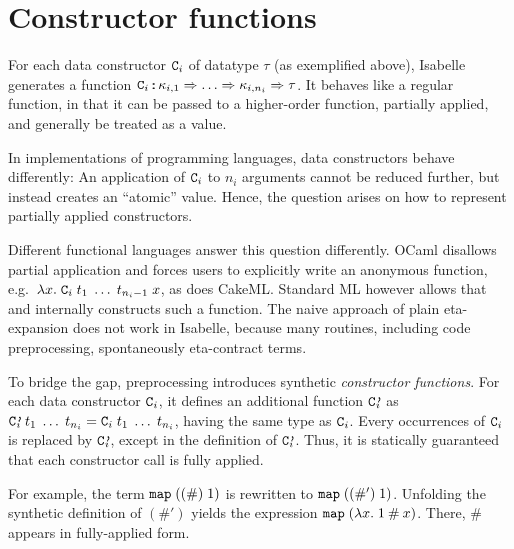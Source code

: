 
\section{Constructor functions}
\label{sec:preproc:constructor}


\noindent
For each data constructor $\texttt{\textup{C}}_i$ of datatype $\tau$ (as exemplified above), Isabelle generates a function $\texttt{\textup{C}}_i \mathbin{:\!\!:} \kappa_{i,1} \Rightarrow \ldots \Rightarrow \kappa_{i,n_i} \Rightarrow \tau$.
It behaves like a regular function, in that it can be passed to a higher-order function, partially applied, and generally be treated as a value.

In implementations of programming languages, data constructors behave differently:
An application of $\texttt{\textup{C}}_i$ to $n_i$ arguments cannot be reduced further, but instead creates an ``atomic'' value.
Hence, the question arises on how to represent partially applied constructors.

Different functional languages answer this question differently.
OCaml disallows partial application and forces users to explicitly write an anonymous function, e.g.\ $\lambda x.\; \texttt{\textup{C}}_i\;t_1\;\ldots\;t_{n_i-1}\;x$, as does CakeML.
Standard ML however allows that and internally constructs such a function.
The naive approach of plain eta-expansion does not work in Isabelle, because many routines, including code preprocessing, spontaneously eta-contract terms.

To bridge the gap, preprocessing introduces synthetic \emph{constructor functions}.
For each data constructor $\texttt{\textup{C}}_i$, it defines an additional function $\texttt{\textup{C'}}\!\!\!_i$ as $\texttt{\textup{C'}}\!\!\!_i\;t_1\;\ldots\;t_{n_i} = \texttt{\textup{C}}_i\;t_1\;\ldots\;t_{n_i}$, having the same type as $\texttt{\textup{C}}_i$.
Every occurrences of $\texttt{\textup{C}}_i$ is replaced by $\texttt{\textup{C'}}\!\!\!_i$, except in the definition of $\texttt{\textup{C'}}\!\!\!_i$.
Thus, it is statically guaranteed that each constructor call is fully applied.

For example, the term $\texttt{\textup{map}}\;((\#)\;1)$ is rewritten to $\texttt{\textup{map}}\;((\#')\;1)$.
Unfolding the synthetic definition of $(\#')$ yields the expression $\texttt{\textup{map}}\;(\lambda x.\; 1 \mathbin{\mathtt{\#}} x)$.
There, $\#$ appears in fully-applied form.